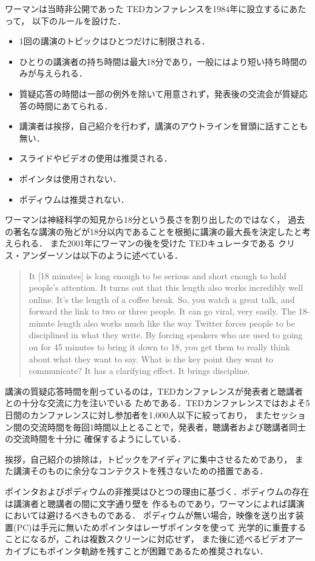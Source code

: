 \documentclass[submit,techreq,jkeyword,noauthor]{ipsj}
\newcommand{\TED}{\textrm{TED}}
\begin{document}
ワーマンは当時非公開であった \TED カンファレンスを1984年に設立するにあたって，
以下のルールを設けた．
\begin{itemize}
\item 1回の講演のトピックはひとつだけに制限される．
\item ひとりの講演者の持ち時間は最大18分であり，一般にはより短い持ち時間のみが与えられる．
\item 質疑応答の時間は一部の例外を除いて用意されず，発表後の交流会が質疑応答の時間にあてられる．
\item 講演者は挨拶，自己紹介を行わず，講演のアウトラインを冒頭に話すことも無い．
\item スライドやビデオの使用は推奨される．
\item ポインタは使用されない．
\item ポディウムは推奨されない．
\end{itemize}
ワーマンは神経科学の知見から18分という長さを割り出したのではなく，
過去の著名な講演の殆どが18分以内であることを根拠に講演の最大長を決定したと考えられる．\cite{cg}
また2001年にワーマンの後を受けた \TED キュレータである
クリス・アンダーソンは以下のように述べている．\cite{cgweb}
\begin{quote}
It [18 minutes] is long enough to be serious and short enough to hold people's attention.
It turns out that this length also works incredibly well online. It's the length of a 
coffee break. So, you watch a great talk, and forward the link to two or three people. 
It can go viral, very easily. The 18-minute length also works much like the way Twitter 
forces people to be disciplined in what they write. By forcing speakers who are used to 
going on for 45 minutes to bring it down to 18, you get them to really think about what 
they want to say. What is the key point they want to communicate? It has a clarifying 
effect. It brings discipline.
\end{quote}

講演の質疑応答時間を削っているのは，\TED カンファレンスが発表者と聴講者との十分な交流に力を注いでいる
ためである．\TED カンファレンスではおよそ5日間のカンファレンスに対し参加者を1,000人以下に絞っており，
またセッション間の交流時間を毎回1時間以上とることで，発表者，聴講者および聴講者同士の交流時間を十分に
確保するようにしている．

挨拶，自己紹介の排除は，トピックをアイディアに集中させるためであり，
また講演そのものに余分なコンテクストを残さないための措置である．

ポインタおよびポディウムの非推奨はひとつの理由に基づく．ポディウムの存在は講演者と聴講者の間に文字通り壁を
作るものであり，ワーマンによれば講演においては避けるべきものである．
ポディウムが無い場合，映像を送り出す装置(PC)は手元に無いためポインタはレーザポインタを使って
光学的に重畳することになるが，これは複数スクリーンに対応せず，
また後に述べるビデオアーカイブにもポインタ軌跡を残すことが困難であるため推奨されない．
\end{document}
